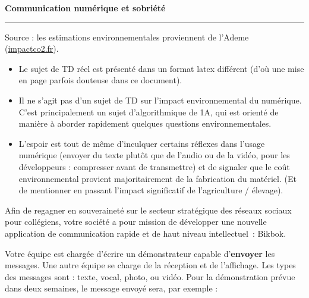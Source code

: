 
\begin{center}
  \Large\bf Communication numérique et sobriété
\end{center}

\noindent\rule{\linewidth}{.6pt}

\bigskip

Source : les estimations environnementales proviennent de l'Ademe (\url{impactco2.fr}).

\ifclimasup
{}
\begin{itemize}
\item Le sujet de TD réel est présenté dans un format latex différent (d'où une mise en page parfois douteuse dans ce document).
\item Il ne s'agit pas d'un sujet de TD sur l'impact environnemental du numérique. C'est principalement un sujet d'algorithmique de 1A, qui est orienté de manière à aborder rapidement quelques questions environnementales.
\item L'espoir est tout de même d'inculquer certains réflexes dans l'usage numérique (envoyer du texte plutôt que de l'audio ou de la vidéo, pour les développeurs : compresser avant de transmettre)
et de signaler que le coût environnemental provient majoritairement de la fabrication du matériel. (Et de mentionner en passant l'impact significatif de l'agriculture / élevage).
\end{itemize}
\fi


Afin de regagner en souveraineté sur le secteur stratégique des réseaux sociaux pour collégiens, votre société a pour mission de développer une nouvelle application de communication rapide et
de haut niveau intellectuel~: Bikbok.
\medskip

Votre équipe est chargée d'écrire un démonstrateur capable d'\textbf{envoyer} les messages. Une autre équipe se charge de la réception et de l'affichage. Les types des messages sont :
texte, vocal, photo, ou vidéo.
Pour la démonstration prévue dans deux semaines, le message envoyé sera, par exemple :

\medskip
\centerline{}
\medskip

